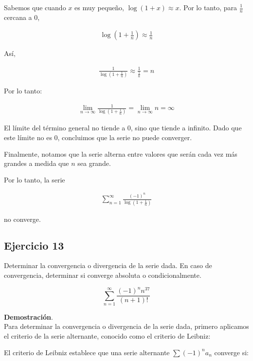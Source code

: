 \documentclass{article}
\begin{document}
    Sabemos que cuando \( x \) es muy pequeño, \( \log(1+x) \approx x \). Por lo tanto, para \( \frac{1}{n} \) cercana a 0,

    \begin{align*}
    \log \left(1+\frac{1}{n}\right) \approx \frac{1}{n}
    \end{align*}

    Así,

    \begin{align*}
    \frac{1}{\log \left(1+\frac{1}{n}\right)} \approx \frac{1}{\frac{1}{n}} = n
    \end{align*}

    Por lo tanto:

    \begin{align*}
    \lim _{n \rightarrow \infty} \frac{1}{\log \left(1+\frac{1}{n}\right)} = \lim _{n \rightarrow \infty} n = \infty
    \end{align*}

    El límite del término general no tiende a 0, sino que tiende a infinito. Dado que este límite no es 0, concluimos que la serie no puede converger.

    Finalmente, notamos que la serie alterna entre valores que serán cada vez más grandes a medida que \( n \) sea grande.

    Por lo tanto, la serie

    \begin{align*}
    \sum_{n=1}^{\infty} \frac{(-1)^{n}}{\log \left(1+\frac{1}{n}\right)}
    \end{align*}

    no converge.



    \subsection*{Ejercicio 13}

    Determinar la convergencia o divergencia de la serie dada. En caso de convergencia, determinar si converge absoluta o condicionalmente.

    $$
    \sum_{n=1}^{\infty} \frac{(-1)^{n} n^{37}}{(n+1)!}
    $$

    \textbf{Demostración}.\\

    Para determinar la convergencia o divergencia de la serie dada, primero aplicamos el criterio de la serie alternante, conocido como el criterio de Leibniz:

    El criterio de Leibniz establece que una serie alternante $\sum (-1)^n a_n$ converge si:
\end{document}
